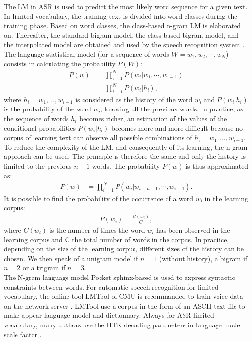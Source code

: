 The LM in ASR is used to predict the most likely word sequence for a given text. In limited vocabulary, the training text is divided into word classes during the training phase. Based on word classes, the class-based n-gram LM is elaborated on. Thereafter, the standard bigram model, the class-based bigram model, and the interpolated model are obtained and used by the speech recognition system . 
The language statistical model (for a sequence of words $W=w_1,w_2,\cdots,w_N$) consists in calculating the probability $P(W)$:
\begin{align}
    P(w)&=\prod_{i=1}^{N} P(w_i|w_1,\cdots,w_{i-1})\\
        &=\prod_{i=1}^{N}P(w_i|h_i),
\end{align}
    where $h_i=w_1,...,w_{i-1}$ is considered as the history of the word $w_i$ and $P(w_i |h_i)$ is the probability of the word $w_i$, knowing all the previous words. 
In practice, as the sequence of words $h_i$ becomes richer, an estimation of the values of the conditional probabilities $P(w_i |h_i)$ becomes more and more difficult because no corpus of learning text can observe all possible combinations of $h_i=w_1,...,w_{i-1}$.
To reduce the complexity of the LM, and consequently of its learning, the n-gram approach can be used. The principle is therefore the same and only the history is limited to the previous $n-1$ words. The probability $P(w)$ is thus approximated as:
\begin{align}
    P(w)&=\prod_{i=1}^{N} P(w_i|w_{i-n+1},\cdots,w_{i-1}).
\end{align}
It is possible to find the probability of the occurrence of a word $w_i$ in the learning corpus:
\begin{align}
    P(w_i)=\frac{C(w_i)}{C},
\end{align}
where $C(w_i)$ is the number of times the word $w_i$ has been observed in the learning corpus and C the total number of words in the corpus.
In practice, depending on the size of the learning corpus, different sizes of the history can be chosen. We then speak of a unigram model if $n = 1$ (without history), a bigram if $n = 2$ or a trigram if $n = 3$.\\
The N-gram language model Pocket sphinx-based is used to express syntactic constraints between words. For automatic speech recognition for limited vocabulary, the online tool LMTool of CMU is recommanded to train voice data on the network server . LMTool use a corpus in the form of an ASCII text file to make appear language model and dictionnary. Always for ASR limited vocabulary, many authors use the HTK decoding parameters in language model scale factor .


